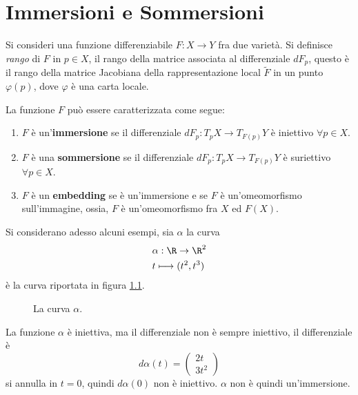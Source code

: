 \documentclass[10pt, letterpaper]{report}
\begin{document}
\chapter{Immersioni e Sommersioni}
Si consideri una funzione differenziabile $F:X\rightarrow Y$ fra due varietà. Si definisce \textit{rango} di $F$ in $p\in X$, il rango della matrice associata al differenziale $dF_p$, questo è il rango della matrice Jacobiana della rappresentazione local $\tilde F$ in un punto $\varphi(p)$, dove $\varphi$ è una carta locale.\begin{definizione} La funzione $F$ può essere caratterizzata come segue:
    \begin{enumerate}
        \item $F$ è un'\textbf{immersione} se il differenziale $dF_p:T_pX\rightarrow T_{F(p)}Y$ è iniettivo $\forall p\in X$.
        \item $F$  è una \textbf{sommersione} se il differenziale $dF_p:T_pX\rightarrow T_{F(p)}Y$ è suriettivo $\forall p\in X$.
        \item $F$ è un \textbf{embedding} se è un'immersione e se $F$ è un'omeomorfismo sull'immagine, ossia, $F$ è un'omeomorfismo fra $X$ ed $F(X)$.
    \end{enumerate}
\end{definizione}
Si considerano adesso alcuni esempi, sia $\alpha$ la curva\begin{align}
    &\alpha:\R\rightarrow\R^2\\
    &t\longmapsto (t^2,t^3)
\end{align}
è la curva riportata in figura \ref{img:esempio_curva}.

\begin{figure}[h!]
    \center
    \caption{La curva $\alpha$.}
    \label{img:esempio_curva}
\end{figure}
La funzione $\alpha$ è iniettiva, ma il differenziale non è sempre iniettivo, il differenziale è \begin{equation}
    d\alpha(t)=\begin{pmatrix}
        2t\\3t^2
    \end{pmatrix}
\end{equation}
si annulla in $t=0$, quindi $ d\alpha(0)$ non è iniettivo. $\alpha$ non è quindi un'immersione.\bigskip
\end{document}
